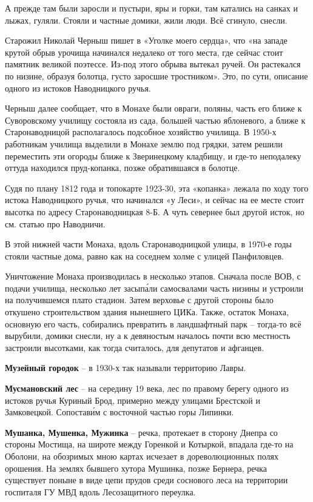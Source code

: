 А прежде там были заросли и пустыри, яры и горки, там катались на санках и лыжах, гуляли. Стояли и частные домики, жили люди. Всё сгинуло, снесли.

Старожил Николай Черныш пишет в «Уголке моего сердца», что «на западе крутой обрыв урочища начинался недалеко от того места, где сейчас стоит памятник великой поэтессе. Из-под этого обрыва вытекал ручей. Он растекался по низине, образуя болотца, густо заросшие тростником». Это, по сути, описание одного из истоков Наводницкого ручья.

Черныш далее сообщает, что в Монахе были овраги, поляны, часть его ближе к Суворовскому училищу состояла из сада, большей частью яблоневого, а ближе к Старонаводницой располагалось подсобное хозяйство училища. В 1950-х работникам училища выделили в Монахе землю под грядки, затем решили переместить эти огороды ближе к Зверинецкому кладбищу, и где-то неподалеку оттуда находился пруд-копанка, позже обратившаяся в болотце. 

Судя по плану 1812 года и топокарте 1923-30, эта «копанка» лежала по ходу того истока Наводницкого ручья, что начинался «у Леси», и сейчас на ее месте стоит высотка по адресу Старонаводницкая 8-Б. А чуть севернее был другой исток, но см. статью про Наводничи.

В этой нижней части Монаха, вдоль Старонаводницкой улицы, в 1970-е годы стояли частные дома, равно как на соседнем холме с улицей Панфиловцев. 

Уничтожение Монаха производилась в несколько этапов. Сначала после ВОВ, с подачи училища, несколько лет засып\'али самосвалами часть низины и устроили на получившемся плато стадион. Затем верховье с другой стороны было откушено строительством здания нынешнего ЦИКа. Также, остаток Монаха, основную его часть, собирались превратить в ландшафтный парк – тогда-то всё вырубили, домики снесли, ну а к девяностым началось почти всю местность застроили высотками, как тогда считалось, для депутатов и афганцев.

\medskip

\textbf{Музейный городок} – в 1930-х так называли территорию Лавры.\\

\medskip

\textbf{Мусмановский лес} – на середину 19 века, лес по правому берегу одного из истоков ручья Куриный Брод, примерно между улицами Брестской и Замковецкой. Сопостав\'им с восточной частью горы Липинки.\\


\medskip

\textbf{Мушанка, Мушенка, Мужинка} – речка, протекает в сторону Днепра со стороны Мостища, на широте между Горенкой и Котыркой, впадала где-то на Оболони, на обозримых мною картах исчезает в дореволюционных полях орошения. На землях бывшего хутора Мушинка, позже Бернера, речка существует поныне в виде цепи прудов среди соснового леса на территории госпиталя ГУ МВД вдоль Лесозащитного переулка.
